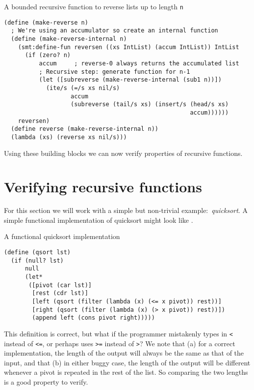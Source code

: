 \begin{program}
\caption{A bounded recursive function to reverse lists up to length \texttt{n}}
\label{fig:reverse-rkt}
\begin{verbatim}
(define (make-reverse n)
  ; We're using an accumulator so create an internal function
  (define (make-reverse-internal n)
    (smt:define-fun reversen ((xs IntList) (accum IntList)) IntList
      (if (zero? n)
          accum     ; reverse-0 always returns the accumulated list
          ; Recursive step: generate function for n-1
          (let ([subreverse (make-reverse-internal (sub1 n))])
            (ite/s (=/s xs nil/s)
                   accum
                   (subreverse (tail/s xs) (insert/s (head/s xs)
                                                     accum))))))
    reversen)
  (define reverse (make-reverse-internal n))
  (lambda (xs) (reverse xs nil/s)))
\end{verbatim}
\end{program}

Using these building blocks we can now verify properties of recursive
functions.

\section{Verifying recursive functions}

For this section we will work with a simple but non-trivial
example:~\textit{quicksort}. A simple functional implementation of quicksort
might look like .

\begin{program}
\caption{A functional quicksort implementation}
\label{fig:qsort}
\begin{verbatim}
(define (qsort lst)
  (if (null? lst)
      null
      (let*
       ([pivot (car lst)]
        [rest (cdr lst)]
        [left (qsort (filter (lambda (x) (<= x pivot)) rest))]
        [right (qsort (filter (lambda (x) (> x pivot)) rest))])
        (append left (cons pivot right)))))
\end{verbatim}
\end{program}

This definition is correct, but what if the programmer mistakenly types in
\texttt{<} instead of \texttt{<=}, or perhaps uses \texttt{>=} instead of
\texttt{>}? We note that (a) for a correct implementation, the length of the
output will always be the same as that of the input, and that (b) in either
buggy case, the length of the output will be different whenever a pivot is
repeated in the rest of the list. So comparing the two lengths is a good
property to verify.

